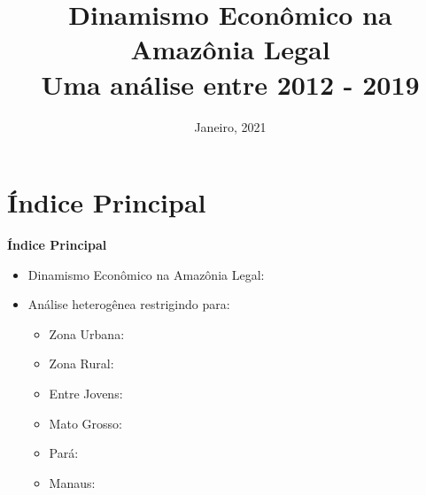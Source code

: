 \documentclass[10pt]{beamer}
\date{Janeiro, 2021}
\title{Dinamismo Econômico na Amazônia Legal \\ Uma análise entre 2012 - 2019}
\begin{document}

\begin{frame}
\titlepage
\end{frame}


\section{Índice Principal}

\begin{frame}[label=indice_principal]{}

\textbf{Índice Principal}
\vspace{2mm}
\begin{itemize}

\item{Dinamismo Econômico na Amazônia Legal: \hyperlink{indice_principal_amz}{}}
\vspace{3mm}

\item{Análise heterogênea restrigindo para:
	\begin{itemize}
	\item{Zona Urbana: \hyperlink{indice_principal_amz_urbana}{}}
	\vspace{1mm}

	\item{Zona Rural: \hyperlink{indice_principal_amz_rural}{}}
	\vspace{1mm}

	\item{Entre Jovens: \hyperlink{indice_principal_amz_mt}{}}
	\vspace{1mm}

	\item{Mato Grosso: \hyperlink{indice_principal_amz_mt}{}}
	\vspace{1mm}

	\item{Pará: \hyperlink{indice_principal_amz_pa}{}}
	\vspace{1mm}

	\item{Manaus: \hyperlink{indice_principal_amz_manaus}{}}
	\vspace{1mm}
	\end{itemize}
}

\end{itemize}

\end{frame}
\end{document}
